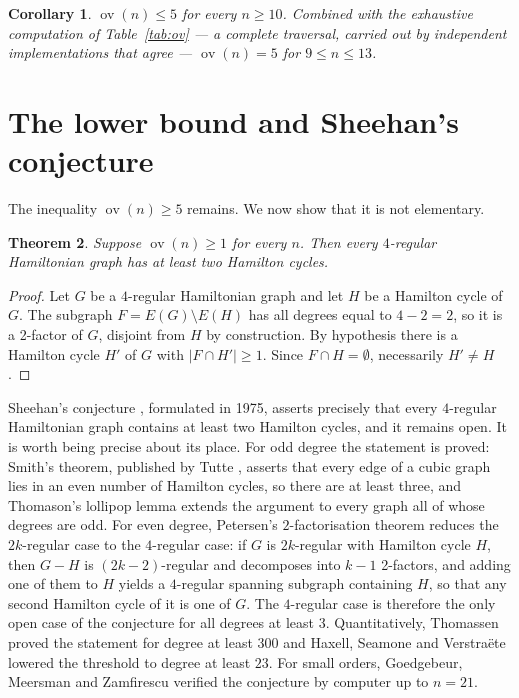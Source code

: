 \documentclass[11pt,a4paper]{article}
\newtheorem{theorem}{Theorem}[section]
\newtheorem{corollary}[theorem]{Corollary}
\theoremstyle{definition}
\theoremstyle{remark}
\newcommand{\ov}{\operatorname{ov}}
\begin{document}
\begin{corollary}\label{cor:exact}
$\ov(n)\le5$ for every $n\ge10$. Combined with the exhaustive computation of Table~\ref{tab:ov} --- a complete traversal, carried out by independent implementations that agree --- $\ov(n)=5$ for $9\le n\le13$.
\end{corollary}

\section{The lower bound and Sheehan's conjecture}\label{sec:sheehan}

The inequality $\ov(n)\ge5$ remains. We now show that it is not elementary.

\begin{theorem}\label{thm:sheehan}
Suppose $\ov(n)\ge1$ for every $n$. Then every $4$-regular Hamiltonian graph has at least two Hamilton cycles.
\end{theorem}

\begin{proof}
Let $G$ be a $4$-regular Hamiltonian graph and let $H$ be a Hamilton cycle of $G$. The subgraph $F=E(G)\setminus E(H)$ has all degrees equal to $4-2=2$, so it is a 2-factor of $G$, disjoint from $H$ by construction. By hypothesis there is a Hamilton cycle $H'$ of $G$ with $|F\cap H'|\ge1$. Since $F\cap H=\emptyset$, necessarily $H'\ne H$.
\end{proof}

Sheehan's conjecture \cite{sheehan}, formulated in 1975, asserts precisely that every $4$-regular Hamiltonian graph contains at least two Hamilton cycles, and it remains open. It is worth being precise about its place. For odd degree the statement is proved: Smith's theorem, published by Tutte \cite{tutte46}, asserts that every edge of a cubic graph lies in an even number of Hamilton cycles, so there are at least three, and Thomason's lollipop lemma \cite{thomason78} extends the argument to every graph all of whose degrees are odd. For even degree, Petersen's $2$-factorisation theorem reduces the $2k$-regular case to the $4$-regular case: if $G$ is $2k$-regular with Hamilton cycle $H$, then $G-H$ is $(2k-2)$-regular and decomposes into $k-1$ 2-factors, and adding one of them to $H$ yields a $4$-regular spanning subgraph containing $H$, so that any second Hamilton cycle of it is one of $G$. The $4$-regular case is therefore the only open case of the conjecture for all degrees at least $3$. Quantitatively, Thomassen \cite{thomassen98} proved the statement for degree at least $300$ and Haxell, Seamone and Verstraëte \cite{hsv} lowered the threshold to degree at least $23$. For small orders, Goedgebeur, Meersman and Zamfirescu \cite{gmz20} verified the conjecture by computer up to $n=21$.
\end{document}
